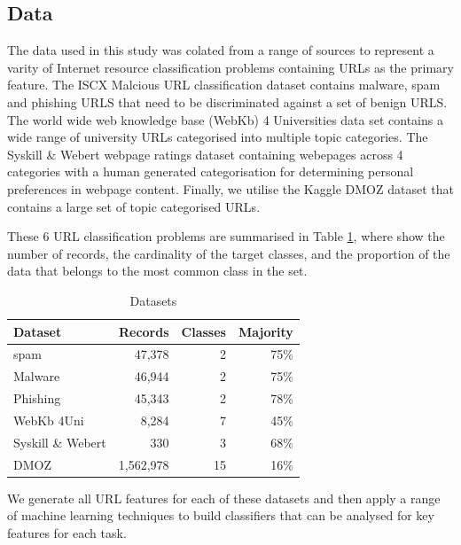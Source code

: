 \documentclass[sigconf]{acmart}
\begin{document}
\subsection{Data}
The data used in this study was colated from a range of sources to represent a varity of
Internet resource classification problems containing URLs as the primary feature.
The ISCX Malcious URL classification dataset contains malware, spam and phishing URLS
that need to be discriminated against a set of benign URLS\cite{Mamun2016}.
The world wide web knowledge base (WebKb) 4 Universities data set contains a wide
range of university URLs categorised into multiple topic categories\cite{Craven1998}.
The Syskill \& Webert webpage ratings dataset containing webepages across 4 categories
with a human generated categorisation for determining personal preferences in webpage
content\cite{Pazzani1996}. Finally, we utilise the Kaggle DMOZ dataset that contains
a large set of topic categorised URLs\cite{dmoz}.

These 6 URL classification problems are summarised in Table \ref{tab:data}, where
show the number of records, the cardinality of the target classes, and the proportion
of the data that belongs to the most common class in the set.

\begin{table}
\caption{Datasets}
\label{tab:data}
\begin{tabular}{|l|r|r|r|}
\toprule
Dataset              &Records        &Classes  &Majority    \\
\midrule
spam                 &47,378          &2       &75\%        \\
Malware              &46,944          &2       &75\%        \\
Phishing             &45,343          &2       &78\%        \\
WebKb 4Uni           &8,284           &7       &45\%        \\
Syskill \& Webert    &330             &3       &68\%        \\
DMOZ                 &1,562,978       &15      &16\%        \\
\bottomrule
\end{tabular}
\end{table}

We generate all URL features for each of these datasets and then apply a range of machine learning
techniques to build classifiers that can be analysed for key features for each task.
\end{document}
